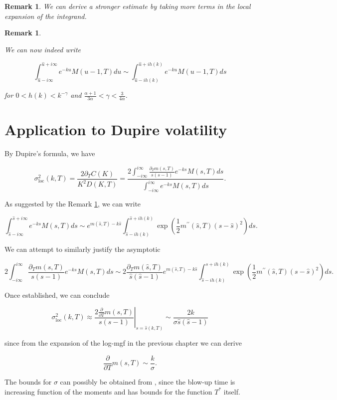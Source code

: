 \documentclass[12pt]{article}
\theoremstyle{plain}
\newtheorem{remark}[proposition]{Remark}
\begin{document}
\begin{remark}
We can derive a stronger estimate by taking more terms in the local expansion of the integrand.
\end{remark}

\begin{remark}\label{remark tail estimate}

We can now indeed write 

$$
\int_{\hat u -i\infty}^{\hat u  + i\infty} e^{-ku} M(u-1,T)du \sim \int_{\hat u -ih(k)}^{\hat u + ih(k)} e^{-ku} M(u-1,T)ds
$$

for $0 < h(k) < k^{-\gamma}$ and $\frac{\alpha+1}{3\alpha}< \gamma < \frac{3}{4\alpha} $.

\end{remark}

\section{Application to Dupire volatility}

By Dupire's formula, we have

$$
\sigma_{\mathrm{loc}}^{2}(k, T)=\frac{2 \partial_{T} C(K)}{K^{2} D(K, T)}=\frac{2 \int_{-i \infty}^{i \infty} \frac{\partial_{T} m(s, T)}{s(s-1)} e^{-k s} M(s, T) d s}{\int_{-i \infty}^{i \infty} e^{-k s} M(s, T) d s}.
$$

As suggested by the Remark \ref{remark tail estimate}, we can write

$$
\int_{\hat{s}-i \infty}^{\hat{s}+i \infty} e^{-k s} M(s, T) d s \sim e^{m(\hat{s}, T)-k \hat{s}} \int_{\hat{s}-i h(k)}^{\hat{s}+i h(k)} \exp \left(\frac{1}{2} m^{\prime \prime}(\hat{s}, T)(s-\hat{s})^{2}\right) d s.
$$

We can attempt to similarly justify the asymptotic

$$
2 \int_{-i \infty}^{i \infty} \frac{\partial_{T} m(s, T)}{s(s-1)} e^{-k s} M(s, T) d s \sim 2 \frac{\partial_{T} m(\hat{s}, T)}{\hat{s}(\hat{s}-1)} e^{m(\hat{s}, T)-k \hat{s}} \int_{\hat{s}-i h(k)}^{\hat{s}+i h(k)} \exp \left(\frac{1}{2} m^{\prime \prime}(\hat{s}, T)(s-\hat{s})^{2}\right) d s.
$$

Once established, we can conclude

$$
\left.\sigma_{\operatorname{loc}}^{2}(k, T) \approx \frac{2 \frac{\partial}{\partial T} m(s, T)}{s(s-1)}\right|_{s=\hat{s}(k, T)} \sim \frac{2k}{\sigma \hat s  (\hat s-1) }
$$

since from the expansion of the log-mgf in the previous chapter we can derive

$$
\frac{\partial}{\partial T} m(s,T) \sim \frac k\sigma.
$$

The bounds for $\sigma$ can possibly be obtained from \cite{GGP18}, since the blow-up time is increasing function of the moments and \cite{GGP18} has bounds for the function $T^*$ itself.

\newpage

\printbibliography
\end{document}

